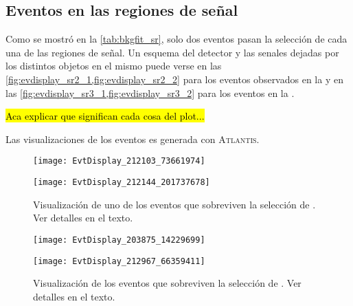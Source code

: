 \subsection{Eventos en las regiones de señal}

Como se mostró en la \cref{tab:bkgfit_sr}, solo dos eventos pasan la selección de cada una de las regiones de
señal.
Un esquema del detector y las senales dejadas por los distintos objetos en el mismo puede verse en las
\cref{fig:evdisplay_sr2_1,fig:evdisplay_sr2_2} para los eventos observados en la {\SRL} y en las
\cref{fig:evdisplay_sr3_1,fig:evdisplay_sr3_2} para los eventos en la {\SRH}.

\hl{Aca explicar que significan cada cosa del plot...}


Las visualizaciones
de los eventos es generada con \textsc{Atlantis}\cite{atlantis}.


\begin{figure}[!htbp]
  \begin{center}

    \texttt{[image: EvtDisplay\_212103\_73661974]}

    \vspace{1cm}

    \texttt{[image: EvtDisplay\_212144\_201737678]}

    \caption{Visualización de uno de los eventos que sobreviven la selección de {\SRL}. Ver detalles en el texto.} %
    \label{fig:evdisplay_sr2_1}
  \end{center}
\end{figure}


\begin{figure}[!htbp]
  \begin{center}

    \texttt{[image: EvtDisplay\_203875\_14229699]}

    \vspace{1cm}

    \texttt{[image: EvtDisplay\_212967\_66359411]}

  \caption{Visualización de los eventos que sobreviven la selección de {\SRH}. Ver detalles en el texto.} %
  \label{fig:evdisplay_sr3_1}
  \end{center}
\end{figure}


